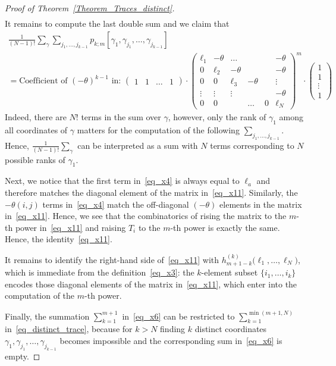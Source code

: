 \begin{proof}[Proof of Theorem~\ref{Theorem_Traces_distinct}]
\begin{multline}
\end{multline}
It remains to compute the last double sum and we claim that
\begin{multline}
\label{eq_x11}
  \frac{1}{(N-1)!}\sum_{\gamma}  \sum_{j_1,\dots,j_{k-1}} p_{k;m}[\gamma_1,\gamma_{j_1},\dots,\gamma_{j_{k-1}}]\\=
  \text{Coefficient of }(-\theta)^{k-1}\text{ in: }
 \begin{pmatrix}1&1&\dots&1\end{pmatrix} \cdot
   \begin{pmatrix}
                 \ell_1& -\theta &\dots & && -\theta \\
                 0 & \ell_2& -\theta &&& -\theta\\
                 0 & 0 & \ell_3 & -\theta && \vdots\\
                 \vdots &\vdots &\vdots&&& -\theta\\
                 0 &0 &&\dots &0 &\ell_N
  \end{pmatrix}^m
  \cdot \begin{pmatrix} 1\\ 1 \\ \vdots \\ 1 \end{pmatrix}
\end{multline}
Indeed, there are $N!$ terms in the sum over $\gamma$, however, only the rank of $\gamma_1$ among all coordinates of $\gamma$ matters for the computation
of the following $ \sum_{j_1,\dots,j_{k-1}}$. Hence, $\frac{1}{(N-1)!}\sum_{\gamma}$ can be interpreted as a sum with $N$ terms corresponding to $N$ possible
ranks of $\gamma_1$.

Next, we notice that the first term in~\eqref{eq_x4} is always equal to $\ell_a$ and therefore matches the diagonal element of the matrix
in~\eqref{eq_x11}. Similarly, the $-\theta(i,j)$ terms in~\eqref{eq_x4} match the off-diagonal $(-\theta)$ elements in the matrix  in~\eqref{eq_x11}.
Hence, we see that the combinatorics of rising the matrix to the $m$-th power in~\eqref{eq_x11} and raising $T_i$ to the $m$-th power is exactly
the same. Hence, the identity~\eqref{eq_x11}.

It remains to identify the right-hand side of~\eqref{eq_x11} with  $h^{(k)}_{m+1-k}\bigl(\ell_1,\dots,\ell_N\bigr)$, which is immediate from the definition~\eqref{eq_x3}: the $k$-element subset $\{i_1,\dots,i_k\}$ encodes those diagonal elements of the matrix in~\eqref{eq_x11}, which enter into the computation of the $m$-th power.

Finally, the summation $\sum_{k=1}^{m+1}$ in~\eqref{eq_x6} can be restricted to $\sum_{k=1}^{\min(m+1,N)}$ in~\eqref{eq_distinct_trace}, because for $k>N$ finding $k$ distinct coordinates $\gamma_1,\gamma_{j_1},\dots,\gamma_{j_{k-1}}$ becomes impossible and the corresponding sum in~\eqref{eq_x6} is empty.
\end{proof}


